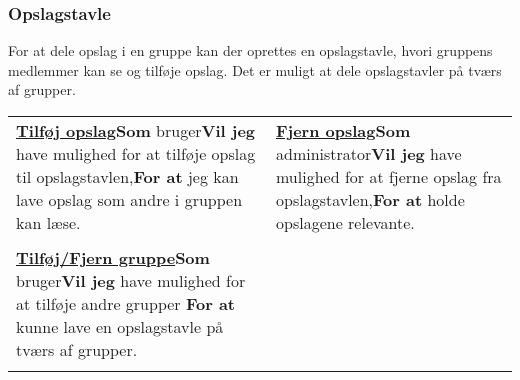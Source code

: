 \subsubsection{Opslagstavle}





For at dele opslag i en gruppe kan der oprettes en opslagstavle, hvori gruppens medlemmer kan se og tilføje opslag. Det er muligt at dele opslagstavler på tværs af grupper.\newline

\begin{tabular}{p{2.5in}p{2.5in}}
\textbf{\underline{Tilføj opslag}}\newline \textbf{Som} bruger\newline \textbf{Vil jeg} have mulighed for at tilføje opslag til opslagstavlen,\newline \textbf{For at} jeg kan lave opslag som andre i gruppen kan læse. & 

\textbf{\underline{Fjern opslag}}\newline \textbf{Som} administrator\newline \textbf{Vil jeg}  have mulighed for at fjerne opslag fra opslagstavlen,\newline \textbf{For at} holde opslagene relevante.  \\\\

\textbf{\underline{Tilføj/Fjern gruppe}}\newline \textbf{Som} bruger\newline \textbf{Vil jeg} have mulighed for at tilføje andre grupper
\newline \textbf{For at} kunne lave en opslagstavle på tværs af grupper.  \\\\
\end{tabular}


